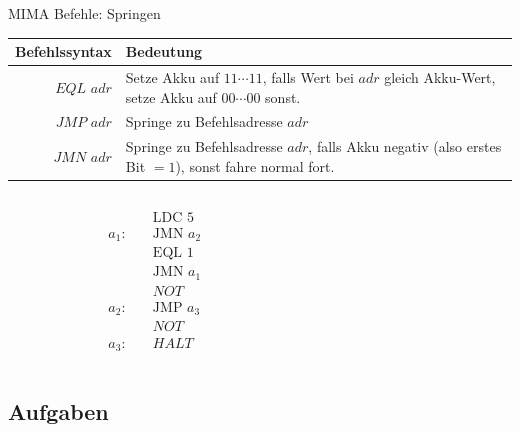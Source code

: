 \begin{frame}{MIMA Befehle: Springen}
	\begin{tabular}{r | p{8cm} }
		Befehlssyntax & Bedeutung\\\hline\hline 
		$EQL$ $adr$ & Setze Akku auf $11\cdots11$, falls Wert bei $adr$ gleich Akku-Wert, setze Akku auf $00\cdots00$ sonst.\\\hline
		$JMP$ $adr$ & Springe zu Befehlsadresse $adr$\\\hline
		$JMN$ $adr$ & Springe zu Befehlsadresse $adr$, falls Akku negativ (also erstes Bit $=1$), sonst fahre normal fort.
	\end{tabular}
	
	\bp 
	\vspace{.5cm}
	\vspace{.0cm}
	
	\begin{columns}
		\begin{column}{0.5\textwidth}
			\begin{align*}
				& \text{LDC 5} \\
				a_1: \quad  & \text{JMN } a_2 \\
				& \text{EQL 1} \\
				& \text{JMN } a_1 \\
				& NOT \\ %
				a_2: \quad & \text{JMP } a_3\\
				& NOT \\ %
				a_3: \quad & HALT
			\end{align*}
		\end{column}
		
		\begin{column}{0.5\textwidth}
			\begin{memory}
			\end{memory}
		\end{column}
	\end{columns}
\end{frame}

\subsection{Aufgaben}

